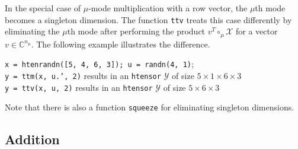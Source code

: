 \documentclass[11pt, a4paper]{article}
\newcommand{\calX}{\mathcal{X}}
\newcommand{\calY}{\mathcal{Y}}
\newcommand{\F}{{\mathbb F}}
\newcommand{\C}{{\mathbb C}}
\begin{document}
\begin{preprint}
In the special case of $\mu$-mode multiplication with a row vector, the $\mu$th mode becomes a
singleton dimension. The function \texttt{ttv} treats this case differently by eliminating
the $\mu$th mode after performing the product $v^T \circ_\mu \calX$
for a vector $v \in \C^{n_\mu}$.
The following example illustrates the difference.
\begin{framed}
\noindent \texttt{x = htenrandn([5, 4, 6, 3]); u = randn(4, 1)}; \\
\texttt{y = ttm(x, u.', 2)} results in an \texttt{htensor} $\calY$ of size $5\times 1\times 6\times 3$\\
\texttt{y = ttv(x, u, 2)} results in an \texttt{htensor} $\calY$ of size $5\times 6\times 3$
\end{framed}
\noindent Note that there is also a function \texttt{squeeze} for eliminating
singleton dimensions.
\end{preprint}

\subsection{Addition} \label{sec:explicitaddition}
\end{document}
